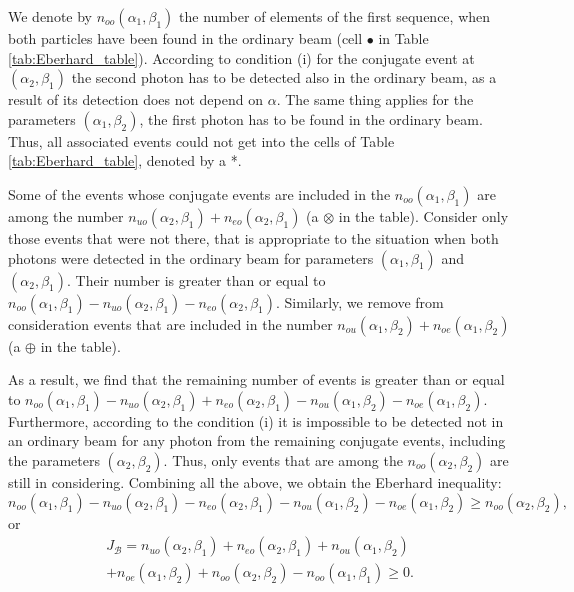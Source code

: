 \documentclass[%
master,         %
subf,           %
href,           %
colorlinks=true %
]{disser}
\numberwithin{equation}{section}
\numberwithin{figure}{section}
\begin{document}
We denote by $ n_{oo} (\alpha_1, \beta_1) $ the number of elements of the first sequence, when both particles have been found in the ordinary beam (cell $ \bullet $ in Table \ref{tab:Eberhard_table}). According to condition (i) for the conjugate event at $ (\alpha_2, \beta_1) $ the second photon has to be detected also in the ordinary beam, as a result of its detection does not depend on $ \alpha $. The same thing applies for the parameters $ (\alpha_1, \beta_2) $, the first photon has to be found in the ordinary beam. Thus, all associated events could not get into the cells of Table \ref{tab:Eberhard_table}, denoted by a *.

Some of the events whose conjugate events are included in the $ n_{oo} (\alpha_1, \beta_1) $ are among the number $ n_{uo} (\alpha_2, \beta_1) + n_ {eo} (\alpha_2, \beta_1) $ (a $ \otimes $ in the table). Consider only those events that were not there, that is appropriate to the situation when both photons were detected in the ordinary beam for parameters $ (\alpha_1, \beta_1) $ and $ (\alpha_2, \beta_1) $. Their number is greater than or equal to $ n_{oo} (\alpha_1, \beta_1) - n_{uo} (\alpha_2, \beta_1) - n_{eo} (\alpha_2, \beta_1) $. Similarly, we remove from consideration events that are included in the number $ n_{ou} (\alpha_1, \beta_2) + n_{oe} (\alpha_1, \beta_2) $ (a $ \oplus $ in the table).

As a result, we find that the remaining number of events is greater than or equal to $ n_{oo} (\alpha_1, \beta_1) - n_{uo} (\alpha_2, \beta_1) + n_{eo} (\alpha_2, \beta_1) - n_{ou} (\alpha_1, \beta_2) - n_{oe} (\alpha_1, \beta_2) $. Furthermore, according to the condition (i) it is impossible to be detected not in an ordinary beam for any photon from the remaining conjugate events, including the parameters $ (\alpha_2, \beta_2) $. Thus, only events that are among the $n_{oo}(\alpha_2, \beta_2)$ are still in considering. Combining all the above, we obtain the Eberhard inequality:
\[
n_{oo}(\alpha_1, \beta_1) - n_{uo}(\alpha_2, \beta_1) - n_{eo}(\alpha_2, \beta_1) - n_{ou}(\alpha_1, \beta_2) - n_{oe}(\alpha_1, \beta_2) \geq n_{oo}(\alpha_2, \beta_2),
\]
or
\begin{multline}
J_{\mathcal{B}} = n_{uo}(\alpha_2, \beta_1) + n_{eo}(\alpha_2, \beta_1) + n_{ou}(\alpha_1, \beta_2) \\
+ n_{oe}(\alpha_1, \beta_2) + n_{oo}(\alpha_2, \beta_2) - n_{oo}(\alpha_1, \beta_1) \geq 0.
\label{eq:Eberhard_inequality}
\end{multline}
\end{document}
